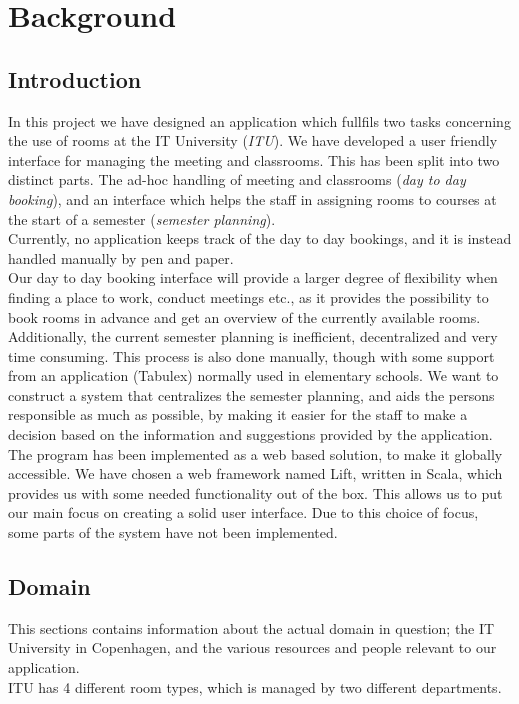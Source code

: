 \chapter{Background}
\section{Introduction}
In this project we have designed an application which fullfils two tasks concerning the use of rooms at the IT University (\emph{ITU}). We have developed a user friendly interface for managing the meeting and classrooms. This has been split into two distinct parts. The ad-hoc handling of meeting and classrooms (\emph{day to day booking}), and an interface which helps the staff in assigning rooms to courses at the start of a semester (\emph{semester planning}).\\

Currently, no application keeps track of the day to day bookings, and it is instead handled manually by pen and paper.\\
Our day to day booking interface will provide a larger degree of flexibility when finding a place to work, conduct meetings etc., as it provides the possibility to book rooms in advance and get an overview of the currently available rooms.\\

Additionally, the current semester planning is inefficient, decentralized and very time consuming. This process is also done manually, though with some support from an application (Tabulex\cite{tabulex}) normally used in elementary schools.
We want to construct a system that centralizes the semester planning, and aids the persons responsible as much as possible, by making it easier for the staff to make a decision based on the information and suggestions provided by the application. \\

The program has been implemented as a web based solution, to make it globally accessible. We have chosen a web framework named Lift, written in Scala, which provides us with some needed functionality out of the box. This allows us to put our main focus on creating a solid user interface. Due to this choice of focus, some parts of the system have not been implemented.

\pagebreak
\section{Domain}
\label{sec:domain}
This sections contains information about the actual domain in question; the IT University in Copenhagen, and the various resources and people relevant to our application. \\
ITU has 4 different room types, which is managed by two different departments.


